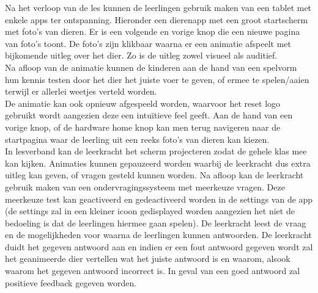 \documentclass[12pt]{article}
\begin{document}
Na het verloop van de les kunnen de leerlingen gebruik maken van een tablet met enkele apps ter ontspanning. Hieronder een dierenapp met een groot startscherm met foto's van dieren. Er is een volgende en vorige knop die een nieuwe pagina van foto's toont. De foto's zijn klikbaar waarna er een animatie afspeelt met bijkomende uitleg over het dier. Zo is de uitleg zowel visueel als auditief.\\
Na afloop van de animatie kunnen de kinderen aan de hand van een spelvorm hun kennis testen door het dier het juiste voer te geven, of ermee te spelen/aaien terwijl er allerlei weetjes verteld worden.\\
De animatie kan ook opnieuw afgespeeld worden, waarvoor het reset logo gebruikt wordt aangezien deze een intu\"itieve feel geeft. Aan de hand van een vorige knop, of de hardware home knop kan men terug navigeren naar de startpagina waar de leerling uit een reeks foto's van dieren kan kiezen.\\ 
In lesverband kan de leerkracht het scherm projecteren zodat de gehele klas mee kan kijken. Animaties kunnen gepauzeerd worden waarbij de leerkracht dus extra uitleg kan geven, of vragen gesteld kunnen worden. Na afloop kan de leerkracht gebruik maken van een ondervragingssysteem met meerkeuze vragen. Deze meerkeuze test kan geactiveerd en gedeactiveerd worden in de settings van de app (de settings zal in een kleiner icoon gedisplayed worden aangezien het niet de bedoeling is dat de leerlingen hiermee gaan spelen). De leerkracht leest de vraag en de mogelijkheden voor waarna de leerlingen kunnen antwoorden. De leerkracht duidt het gegeven antwoord aan en indien er een fout antwoord gegeven wordt zal het geanimeerde dier vertellen wat het juiste antwoord is en waarom, alsook waarom het gegeven antwoord incorrect is. In geval van een goed antwoord zal positieve feedback gegeven worden.

\clearpage
\end{document}
